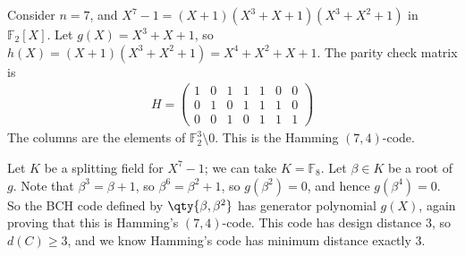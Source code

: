 \begin{example}
    Consider $n = 7$, and $X^7 - 1 = (X + 1)(X^3 + X + 1)(X^3 + X^2 + 1)$ in $\mathbb F_2[X]$.
    Let $g(X) = X^3 + X + 1$, so $h(X) = (X + 1)(X^3 + X^2 + 1) = X^4 + X^2 + X + 1$.
    The parity check matrix is
    \begin{align*}
        H = \begin{pmatrix}
            1 & 0 & 1 & 1 & 1 & 0 & 0 \\
            0 & 1 & 0 & 1 & 1 & 1 & 0 \\
            0 & 0 & 1 & 0 & 1 & 1 & 1
        \end{pmatrix}
    \end{align*}
    The columns are the elements of $\mathbb F_2^3 \setminus \qty{0}$.
    This is the Hamming $(7,4)$-code.

    Let $K$ be a splitting field for $X^7 - 1$; we can take $K = \mathbb F_8$.
    Let $\beta \in K$ be a root of $g$.
    Note that $\beta^3 = \beta + 1$, so $\beta^6 = \beta^2 + 1$, so $g(\beta^2) = 0$, and hence $g(\beta^4) = 0$.
    So the BCH code defined by $\qty{\beta, \beta^2}$ has generator polynomial $g(X)$, again proving that this is Hamming's $(7,4)$-code.
    This code has design distance $3$, so $d(C) \geq 3$, and we know Hamming's code has minimum distance exactly 3.
\end{example}

